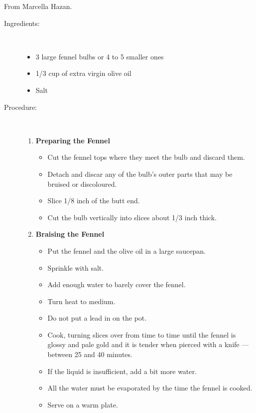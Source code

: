 \documentclass[11pt,letterpaper]{article}
\begin{document}


\begin{flushright}
{\hspace{4in} From Marcella Hazan.}
\end{flushright}
\vspace{0.5in}



\begin{description}

\item[Ingredients:]\ \\
	\begin{itemize}
	\item	3 large fennel bulbs or 4 to 5 smaller ones
	\item 1/3 cup of extra virgin olive oil
	\item Salt
	\end{itemize}

\item[Procedure:]\ \\

	\begin{enumerate}
	\item {\bf Preparing the Fennel}
	\begin{itemize}
	\item Cut the fennel tops where they meet the bulb and discard them.
	\item Detach and discar any of the bulb's outer parts that may be bruised or discoloured.
	\item Slice 1/8 inch of the butt end.
	\item Cut the bulb vertically into slices about 1/3 inch thick.
	\end{itemize}

	\item {\bf Braising the Fennel}
	\begin{itemize}
	\item Put the fennel and the olive oil in a large saucepan.
	\item Sprinkle with salt.
	\item Add enough water to barely cover the fennel.
	\item Turn heat to medium.
	\item Do not put a lead in on the pot.
	\item Cook, turning slices over from time to time until the fennel is glossy and pale gold and it is tender when pierced with a knife --- between 25 and 40 minutes.
	\item If the liquid is insufficient, add a bit more water.
	\item All the water must be evaporated by the time the fennel is cooked.
	\item Serve on a warm plate.
	\end{itemize}

	\end{enumerate}
\end{description}
\end{document}
